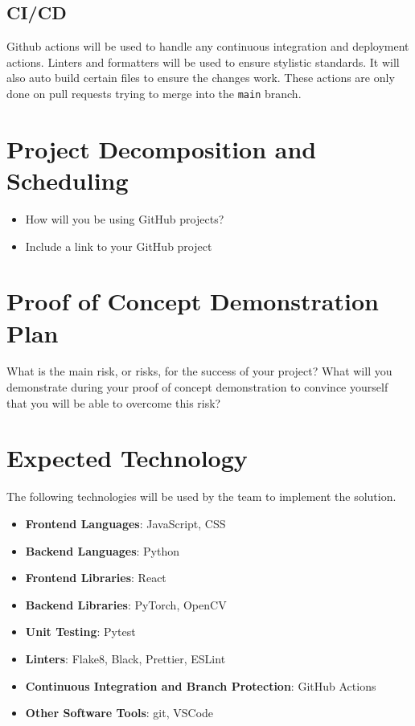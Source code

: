 \documentclass{article}
\begin{document}
\subsection{CI/CD}
Github actions will be used to handle any continuous integration and deployment actions. Linters 
and formatters will be used to ensure stylistic standards. It will also auto build certain files to
ensure the changes work. These actions are only done on pull requests trying to merge into 
the \verb|main| branch.


\section{Project Decomposition and Scheduling}

\begin{itemize}
  \item How will you be using GitHub projects?
  \item Include a link to your GitHub project
\end{itemize}


\section{Proof of Concept Demonstration Plan}

What is the main risk, or risks, for the success of your project?  What will you
demonstrate during your proof of concept demonstration to convince yourself that
you will be able to overcome this risk?

\section{Expected Technology}

The following technologies will be used by the team to implement the solution.
\begin{itemize}
\item \textbf{Frontend Languages}: JavaScript, CSS
\item \textbf{Backend Languages}: Python
\item \textbf{Frontend Libraries}: React
\item \textbf{Backend Libraries}: PyTorch, OpenCV
\item \textbf{Unit Testing}: Pytest
\item \textbf{Linters}: Flake8, Black, Prettier, ESLint
\item \textbf{Continuous Integration and Branch Protection}: GitHub Actions
\item \textbf{Other Software Tools}: git, VSCode
\end{itemize}
\end{document}
